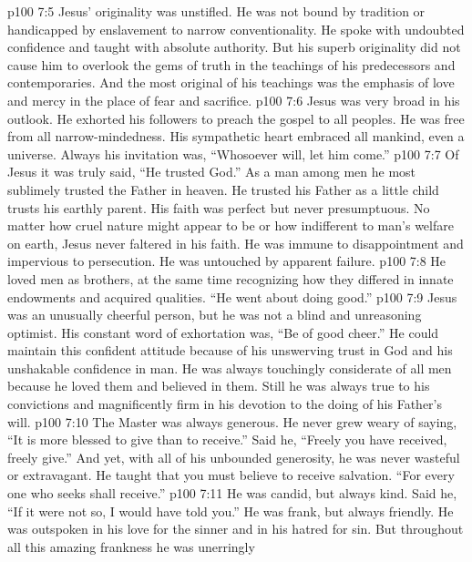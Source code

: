 \vs p100 7:5 Jesus’ originality was unstifled. He was not bound by tradition or handicapped by enslavement to narrow conventionality. He spoke with undoubted confidence and taught with absolute authority. But his superb originality did not cause him to overlook the gems of truth in the teachings of his predecessors and contemporaries. And the most original of his teachings was the emphasis of love and mercy in the place of fear and sacrifice.
\vs p100 7:6 Jesus was very broad in his outlook. He exhorted his followers to preach the gospel to all peoples. He was free from all narrow\hyp{}mindedness. His sympathetic heart embraced all mankind, even a universe. Always his invitation was, \textcolor{ubdarkred}{“Whosoever will, let him come.”}
\vs p100 7:7 Of Jesus it was truly said, “He trusted God.” As a man among men he most sublimely trusted the Father in heaven. He trusted his Father as a little child trusts his earthly parent. His faith was perfect but never presumptuous. No matter how cruel nature might appear to be or how indifferent to man’s welfare on earth, Jesus never faltered in his faith. He was immune to disappointment and impervious to persecution. He was untouched by apparent failure.
\vs p100 7:8 He loved men as brothers, at the same time recognizing how they differed in innate endowments and acquired qualities. “He went about doing good.”
\vs p100 7:9 Jesus was an unusually cheerful person, but he was not a blind and unreasoning optimist. His constant word of exhortation was, \textcolor{ubdarkred}{“Be of good cheer.”} He could maintain this confident attitude because of his unswerving trust in God and his unshakable confidence in man. He was always touchingly considerate of all men because he loved them and believed in them. Still he was always true to his convictions and magnificently firm in his devotion to the doing of his Father’s will.
\vs p100 7:10 The Master was always generous. He never grew weary of saying, \textcolor{ubdarkred}{“It is more blessed to give than to receive.”} Said he, \textcolor{ubdarkred}{“Freely you have received, freely give.”} And yet, with all of his unbounded generosity, he was never wasteful or extravagant. He taught that you must believe to receive salvation. \textcolor{ubdarkred}{“For every one who seeks shall receive.”}
\vs p100 7:11 He was candid, but always kind. Said he, \textcolor{ubdarkred}{“If it were not so, I would have told you.”} He was frank, but always friendly. He was outspoken in his love for the sinner and in his hatred for sin. But throughout all this amazing frankness he was unerringly 
